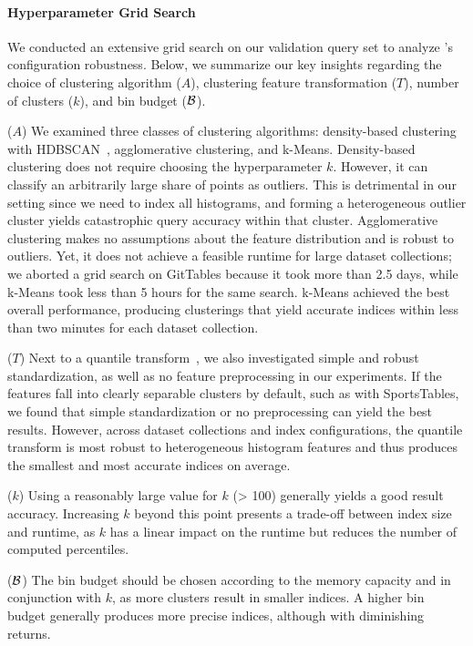 \paragraph{Hyperparameter Grid Search}
We conducted an extensive grid search on our validation query set to analyze \system{}'s configuration robustness.
Below, we summarize our key insights regarding the choice of clustering algorithm ($A$), clustering feature transformation ($T$), number of clusters ($k$), and bin budget ($\mathcal{B}$).

($A$)
We examined three classes of clustering algorithms: density-based clustering with HDBSCAN~\cite{campello_density-based_2013}, agglomerative clustering, and k-Means.
Density-based clustering does not require choosing the hyperparameter $k$.
However, it can classify an arbitrarily large share of points as outliers.
This is detrimental in our setting since we need to index all histograms, and forming a heterogeneous outlier cluster yields catastrophic query accuracy within that cluster.
Agglomerative clustering makes no assumptions about the feature distribution and is robust to outliers.
Yet, it does not achieve a feasible runtime for large dataset collections; we aborted a grid search on GitTables because it took more than 2.5 days, while k-Means took less than 5 hours for the same search.
k-Means achieved the best overall performance, producing clusterings that yield accurate indices within less than two minutes for each dataset collection.

($T$)
Next to a quantile transform~\cite{pedregosa_scikit-learn_2011}, we also investigated simple and robust standardization, as well as no feature preprocessing in our experiments.
If the features fall into clearly separable clusters by default, such as with SportsTables, we found that simple standardization or no preprocessing can yield the best results.
However, across dataset collections and index configurations, the quantile transform is most robust to heterogeneous histogram features and thus produces the smallest and most accurate indices on average.

($k$)
Using a reasonably large value for $k$ (> 100) generally yields a good result accuracy.
Increasing $k$ beyond this point presents a trade-off between index size and runtime, as $k$ has a linear impact on the runtime but reduces the number of computed percentiles.

($\mathcal{B}$)
The bin budget should be chosen according to the memory capacity and in conjunction with $k$, as more clusters result in smaller indices.
A higher bin budget generally produces more precise indices, although with diminishing returns.

